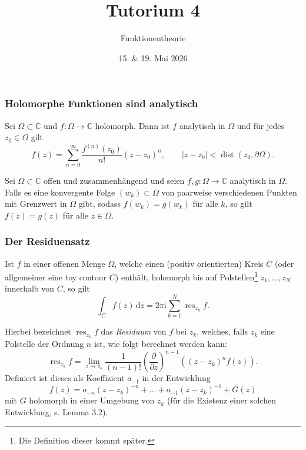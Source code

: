 \documentclass[10pt]{beamer}
\author[\url{https://fdf-uni.github.io/ft}]{}
\title{Tutorium 4}
\subtitle{\texorpdfstring{Funktionentheorie\vspace*{-1.5cm}}{Funktionentheorie}}
\date{15. \& 19. Mai 2026}
\newcommand{\iu}{\mathrm{i}}
\begin{document}
\begin{frame}
	\titlepage
\end{frame}
\begin{frame}
	\frametitle{Holomorphe Funktionen sind analytisch}
	\begin{theorem}
		Sei $\Omega \subset \mathbb{C}$ und $f \colon \Omega \to \mathbb{C}$ holomorph.
		Dann ist $f$ analytisch in $\Omega$ und für jedes $z_0 \in \Omega$ gilt
		\[
			f(z) = \sum_{n = 0}^{\infty} \frac{f^{(n)}(z_0)}{n!}(z - z_0)^n, \qquad \lvert z - z_0 \rvert < \operatorname{dist}(z_0, \partial \Omega).
		\]
	\end{theorem}
	\pause
	\begin{theorem}[Identitätssatz]
		Sei $\Omega \subset \mathbb{C}$ offen und zusammenhängend und seien $f, g \colon \Omega \to \mathbb{C}$ analytisch in $\Omega$.
		Falls es eine konvergente Folge $(w_k) \subset \Omega$ von paarweise verschiedenen Punkten mit Grenzwert in $\Omega$ gibt, sodass $f(w_k) = g(w_k)$ für alle $k$, so gilt $f(z) = g(z)$ für alle $z \in \Omega$.
	\end{theorem}
\end{frame}
\begin{frame}
	\frametitle{Der Residuensatz}
	\begin{theorem}
		Ist $f$ in einer offenen Menge $\Omega$, welche einen (positiv orientierten) Kreis $C$ (oder allgemeiner eine toy contour $C$) enthält, holomorph bis auf Polstellen\footnote{Die Definition dieser kommt später.} $z_1, \dots, z_N$ innerhalb von $C$, so gilt
		\[
			\int_{C} f(z) \,\mathrm{d}z = 2 \pi \iu \sum_{k=1}^{N} \operatorname{res}_{z_k} f.
		\]
	\end{theorem}
	\pause
	Hierbei bezeichnet $\operatorname{res}_{z_k} f$ das \emph{Residuum} von $f$ bei $z_k$, welches, falls $z_k$ eine Polstelle der Ordnung $n$ ist, wie folgt berechnet werden kann:\vspace*{-0.15cm}
	\[
		\operatorname{res}_{z_k} f = \lim_{z \to z_k} \frac{1}{(n-1)!} \left( \frac{\partial}{\partial z} \right)^{n-1} ((z - z_k)^n f(z)).
	\]\vspace*{-0.15cm}
	\pause
	Definiert ist dieses als Koeffizient $a_{-1}$ in der Entwicklung
	\[
		f(z) = a_{-n} (z - z_k)^{-n} + \dots + a_{-1} (z - z_k)^{-1} + G(z)
	\]
	mit $G$ holomorph in einer Umgebung von $z_k$ (für die Existenz einer solchen Entwicklung, s. Lemma 3.2).
\end{frame}
\end{document}
